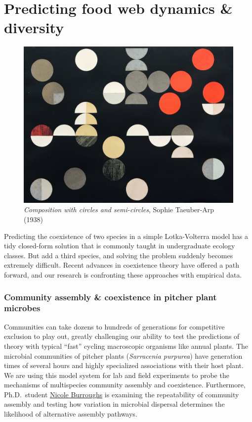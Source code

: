 \documentclass[
  letterpaper,
  DIV=11,
  numbers=noendperiod]{scrartcl}
\author{}
\date{}
\begin{document}
\section{Predicting food web dynamics \&
diversity}\label{predicting-food-web-dynamics-diversity}

\begin{figure}[H]

{\centering \includegraphics[width=8in,height=\textheight,keepaspectratio]{../static/arp-composition-with-circles-semicircles-1938.jpeg}

}

\caption{\emph{Composition with circles and semi-circles}, Sophie
Taeuber-Arp (1938)}

\end{figure}%

Predicting the coexistence of two species in a simple Lotka-Volterra
model has a tidy closed-form solution that is commonly taught in
undergraduate ecology classes. But add a third species, and solving the
problem suddenly becomes extremely difficult. Recent advances in
coexistence theory have offered a path forward, and our research is
confronting these approaches with empirical data.

\subsubsection{Community assembly \& coexistence in pitcher plant
microbes}\label{community-assembly-coexistence-in-pitcher-plant-microbes}

Communities can take dozens to hundreds of generations for competitive
exclusion to play out, greatly challenging our ability to test the
predictions of theory with typical ``fast'' cycling macroscopic
organisms like annual plants. The microbial communities of pitcher
plants (\emph{Sarracenia purpurea}) have generation times of several
hours and highly specialized associations with their host plant. We are
using this model system for lab and field experiments to probe the
mechanisms of multispecies community assembly and coexistence.
Furthermore, Ph.D.~student \href{../people/burroughs-n/about.qmd}{Nicole
Burroughs} is examining the repeatability of community assembly and
testing how variation in microbial dispersal determines the likelihood
of alternative assembly pathways.
\end{document}
